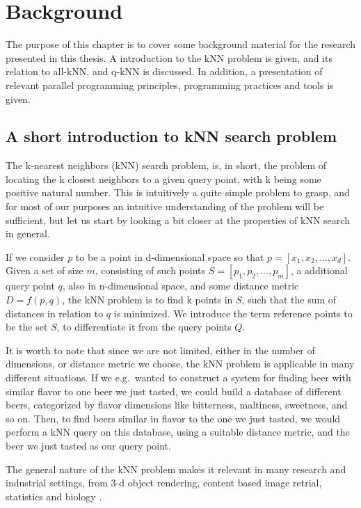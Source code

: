 \chapter{Background}

The purpose of this chapter is to cover some background material for the research presented in this thesis. A introduction to the kNN problem is given, and its relation to all-kNN, and q-kNN is discussed. In addition, a presentation of relevant parallel programming principles, programming practices and tools is given.

\section{A short introduction to kNN search problem} %
\label{a_short_introduction_to_kNN_search_problem}

The k-nearest neighbors (kNN) search problem, is, in short, the problem of locating the k closest neighbors to a given query point, with k being some positive natural number. This is intuitively a quite simple problem to grasp, and for most of our purposes an intuitive understanding of the problem will be sufficient, but let us start by looking a bit closer at the properties of kNN search in general.

If we consider $p$ to be a point in d-dimensional space so that $p = [x_1, x_2,\dots, x_d]$. Given a set of size $m$, consisting of such points $S = [p_1, p_2,\dots, p_m]$, a additional query point $q$, also in n-dimensional space, and some distance metric $D = f(p, q)$, the kNN problem is to find k points in $S$, such that the sum of distances in relation to $q$ is minimized. We introduce the term reference points to be the set $S$, to differentiate it from the query points $Q$. 

It is worth to note that since we are not limited, either in the number of dimensions, or distance metric we choose, the kNN problem is applicable in many different situations. If we e.g.\ wanted to construct a system for finding beer with similar flavor to one beer we just tasted, we could build a database of different beers, categorized by flavor dimensions like bitterness, maltiness, sweetness, and so on. Then, to find beers similar in flavor to the one we just tasted, we would perform a kNN query on this database, using a suitable distance metric, and the beer we just tasted as our query point.

The general nature of the kNN problem makes it relevant in many research and industrial settings, from 3-d object rendering, content based image retrial, statistics and biology \citep[Introduction]{Garcia2010}.

